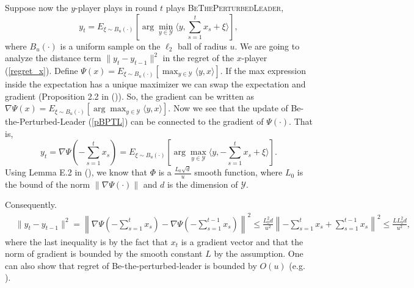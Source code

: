 \documentclass[final,12pt]{colt2018} %
\def\BTPL{\textsc{BeThePerturbedLeader}\xspace}
\newcommand{\norm}[1]{\left\lVert#1\right\rVert}
\newcommand{\YY}{\mathcal{Y}}
\newcommand{\pr}[1]{\left(#1\right)}
\begin{document}
Suppose now the $y$-player plays in round $t$ plays \BTPL,
\begin{equation} \label{pBPTL}
y_t = E_{\xi \sim B_u(\cdot)}[ \arg\min_{y\in \YY} \langle y, \sum_{s=1}^t x_s + \xi \rangle],
\end{equation}
where $B_u(\cdot)$ is a uniform sample on the $\ell_2$ ball of radius $u$.
We are going to analyze the distance term $\| y_t - y_{t-1} \|^2$
in the regret of the $x$-player (\ref{regret_x}).
Define $\Psi(x) = E_{\xi \sim B_u(\cdot)}[ \max_{y \in \YY} \langle y, x \rangle ]$.
If the max expression inside the expectation has a unique maximizer 
we can swap the expectation and gradient (Proposition 2.2 in (\cite{B73})).
So,
the gradient can be written as $\nabla \Psi(x) = E_{\xi \sim B_u(\cdot)}[ \arg\max_{y \in \YY} \langle y, x \rangle ]$.
Now we see that the update of Be-the-Perturbed-Leader (\ref{pBPTL}) can be connected to the gradient of $\Psi(\cdot)$.
That is,
\begin{equation}
y_t = \nabla \Psi(- \sum_{s=1}^t x_s) = E_{\xi \sim B_u(\cdot)}[ \arg\max_{y \in \YY} \langle y, - \sum_{s=1}^t x_s + \xi \rangle ].
\end{equation}
Using Lemma E.2 in (\cite{DBW12}),
we know that $\Phi$ is a $\frac{ L_0 \sqrt{d} }{u}$ smooth function, where $L_{0}$ is the bound of the norm $\| \nabla \Psi(\cdot)  \|$ and $d$ is the dimension of $\YY$.

Consequently.
\begin{equation} \label{shrinkP1}
\begin{aligned}
& \| y_t - y_{t-1}\|^2 = \norm{ \nabla \Psi\pr{- \sum_{s=1}^t x_s} -\nabla \Psi \pr{- \sum_{s=1}^{t-1} x_s} }^2
\leq \frac{L_0^2 d}{u^2} \norm{ - \sum_{s=1}^t x_s + \sum_{s=1}^{t-1} x_s }^2
\leq \frac{L L_0^2 d}{u^2},
\end{aligned}
\end{equation}
where the last inequality is by the fact that $x_t$ is a gradient vector and that the norm of gradient is bounded by the smooth constant $L$ by the assumption.
One can also show that regret of Be-the-perturbed-leader is bounded by $O(u)$ (e.g. \cite{KV05,cesa2006prediction}).  
\end{document}
